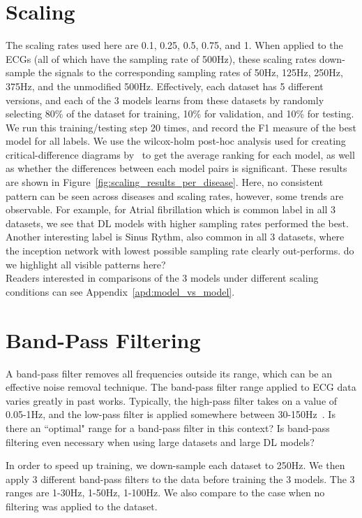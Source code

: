 \documentclass[pmlr,twocolumn]{jmlr}%
\begin{document}
\section{Scaling}
\label{sec:scaling}
The scaling rates used here are 0.1, 0.25, 0.5, 0.75, and 1. When applied to the ECGs (all of which have the sampling rate of 500Hz), these scaling rates down-sample the signals to the corresponding sampling rates of 50Hz, 125Hz, 250Hz, 375Hz, and the unmodified 500Hz. Effectively, each dataset has 5 different versions, and each of the 3 models learns from these datasets by randomly selecting 80\% of the dataset for training, 10\% for validation, and 10\% for testing. We run this training/testing step 20 times, and record the F1 measure of the best model for all labels. We use the wilcox-holm post-hoc analysis used for creating critical-difference diagrams by~\cite{IsmailFawaz2018deep} to get the average ranking for each model, as well as whether the differences between each model pairs is significant. These results are shown in Figure~\ref{fig:scaling_results_per_disease}. Here, no consistent pattern can be seen across diseases and scaling rates, however, some trends are observable. For example, for Atrial fibrillation which is common label in all 3 datasets, we see that DL models with higher sampling rates performed the best. Another interesting label is Sinus Rythm, also common in all 3 datasets,  where the inception network with lowest possible sampling rate clearly out-performs. {\color{red} do we highlight all visible patterns here?}\\

Readers interested in comparisons of the 3 models under different scaling conditions can see Appendix~\ref{apd:model_vs_model}. 

\section{Band-Pass Filtering}
\label{sec:BandPass}
A band-pass filter removes all frequencies outside its range, which can be an effective noise removal technique. The band-pass filter range applied to ECG data varies greatly in past works. Typically, the high-pass filter takes on a value of 0.05-1Hz, and the low-pass filter is applied somewhere between 30-150Hz~\cite{uwaechia2021comprehensive,luo2010review}. Is there an ``optimal" range for a band-pass filter in this context? Is band-pass filtering even necessary when using large datasets and large DL models?

In order to speed up training, we down-sample each dataset to 250Hz. We then apply 3 different band-pass filters to the data before training the 3 models. The 3 ranges are 1-30Hz, 1-50Hz, 1-100Hz. We also compare to the case when no filtering was applied to the dataset. 
\end{document}
